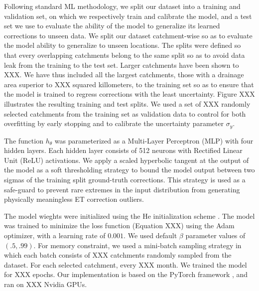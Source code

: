 \documentclass[draft]{agujournal2019}
\begin{document}
Following standard ML methodology, we split our dataset into a training and validation set, 
on which we respectively train and calibrate the model,
and a test set we use to evaluate the ability of the model to generalize its learned corrections to unseen data.
We split our dataset catchment-wise so as to evaluate the model ability to generalize to unseen locations.
The splits were defined so that every overlapping catchments belong to the same split 
so as to avoid data leak from the training to the test set.
Larger catchments have been shown to XXX. 
We have thus included all the largest catchments, those with a drainage area superior to XXX squared killometers, 
to the training set so as to ensure that the model is trained to regress corrections with the least uncertainty.
Figure XXX illustrates the resulting training and test splits. 
We used a set of XXX randomly selected catchments from the training set as validation 
data to control for both overfitting by early stopping and to calibrate the uncertainty parameter $\sigma_y$.

The function $h_\theta$ was parameterized as a Multi-Layer Perceptron (MLP) with four hidden layers.
Each hidden layer consists of 512 neurons with Rectified Linear Unit (ReLU) activations.
We apply a scaled hyperbolic tangent at the output of the model as a soft thresholding strategy 
to bound the model output between two sigmas of the training split ground-truth corrections.
This strategy is used as a safe-guard to prevent rare extremes in the input distribution from 
generating physically meaningless ET correction outliers.
  
The model wieghts were initialized using the He initialization scheme \cite{XXX}.
The model was trained to minimize the loss function (Equation XXX) 
using the Adam optimizer, with a learning rate of $0.001$.
We used default $\beta$ parameter values of $(.5, .99)$.
For memory constraint, we used a mini-batch sampling strategy in which each batch consists of
XXX catchments randomly sampled from the dataset. 
For each selected catchment, every XXX month.
We trained the model for XXX epochs.
Our implementation is based on the PyTorch framework \cite{XXX}, and ran on XXX Nvidia GPUs. 
\end{document}
